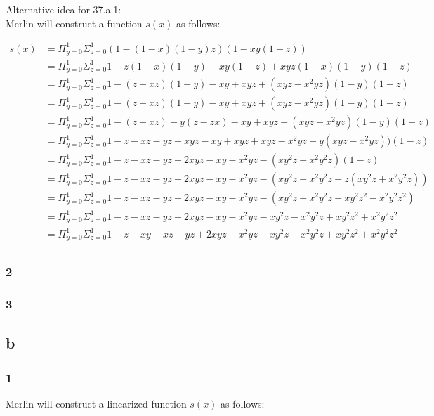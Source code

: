 \documentclass[letterpaper,notitlepage,twoside]{article}
\begin{document}
Alternative idea for 37.a.1:\\
Merlin will construct a function $s(x)$ as follows:

\begin{align*}
s(x) &= \Pi_{y = 0}^1\Sigma_{z = 0}^1 (1 - (1 - x)(1 - y)z)(1 - xy(1 - z)) \\
     &= \Pi_{y = 0}^1\Sigma_{z = 0}^1 1 - z(1 - x)(1 - y) - xy(1 - z) + xyz(1 - x)(1 - y)(1 - z) \\
     &= \Pi_{y = 0}^1\Sigma_{z = 0}^1 1 - (z - xz)(1 - y) - xy + xyz + (xyz - x^2yz)(1 - y)(1 - z) \\
     &= \Pi_{y = 0}^1\Sigma_{z = 0}^1 1 - (z - xz)(1 - y) - xy + xyz + (xyz - x^2yz)(1 - y)(1 - z) \\
     &= \Pi_{y = 0}^1\Sigma_{z = 0}^1 1 - (z - xz) - y(z - zx) - xy + xyz + (xyz - x^2yz)(1 - y)(1 - z) \\
     &= \Pi_{y = 0}^1\Sigma_{z = 0}^1 1 - z - xz - yz + xyz - xy + xyz + xyz - x^2yz - y(xyz - x^2yz))(1 - z) \\
     &= \Pi_{y = 0}^1\Sigma_{z = 0}^1 1 - z - xz - yz + 2xyz - xy - x^2yz - (xy^2z + x^2y^2z)(1 - z) \\
     &= \Pi_{y = 0}^1\Sigma_{z = 0}^1 1 - z - xz - yz + 2xyz - xy - x^2yz - (xy^2z + x^2y^2z - z(xy^2z + x^2y^2z)) \\
     &= \Pi_{y = 0}^1\Sigma_{z = 0}^1 1 - z - xz - yz + 2xyz - xy - x^2yz - (xy^2z + x^2y^2z - xy^2z^2 - x^2y^2z^2) \\
     &= \Pi_{y = 0}^1\Sigma_{z = 0}^1 1 - z - xz - yz + 2xyz - xy - x^2yz - xy^2z - x^2y^2z + xy^2z^2 + x^2y^2z^2 \\
     &= \Pi_{y = 0}^1\Sigma_{z = 0}^1 1 - z - xy - xz - yz + 2xyz - x^2yz - xy^2z - x^2y^2z + xy^2z^2 + x^2y^2z^2 \\
\end{align*}

\subsubsection*{2}
\subsubsection*{3}

\subsection*{b}
\subsubsection*{1}
Merlin will construct a linearized function $s(x)$ as follows:
\end{document}
